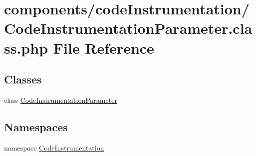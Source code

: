 \hypertarget{_code_instrumentation_parameter_8class_8php}{
\section{components/codeInstrumentation/CodeInstrumentationParameter.class.php File Reference}
\label{_code_instrumentation_parameter_8class_8php}
}
\subsection*{Classes}
\begin{CompactItemize}
\item 
class \hyperlink{class_code_instrumentation_parameter}{CodeInstrumentationParameter}
\end{CompactItemize}
\subsection*{Namespaces}
\begin{CompactItemize}
\item 
namespace \hyperlink{namespace_code_instrumentation}{CodeInstrumentation}
\end{CompactItemize}
